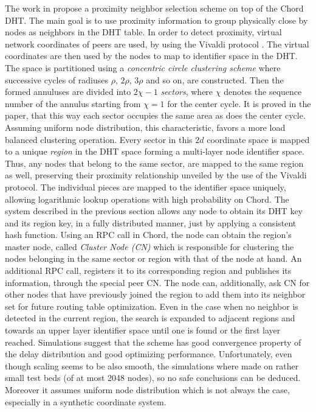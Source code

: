 The work in \cite{DLTZZ2006} propose a proximity neighbor selection
scheme on top of the Chord DHT. The main goal is to use proximity information
to group physically close by nodes as neighbors in the DHT table. In order to
detect proximity, virtual network coordinates of peers are used, by using the
Vivaldi protocol \cite{cox_vivaldi_2004}. The virtual coordinates are then used
by the nodes to map to identifier space in the DHT. The space is partitioned
using a \emph{concentric circle clustering scheme} where successive cycles of
radiuses $\rho$, $2\rho$, $3\rho$ and so on, are constructed. Then the formed
annuluses are divided into $2\chi-1$ \emph{sectors}, where $\chi$ denotes the
sequence number of the annulus starting from $\chi = 1$ for the center cycle. It
is proved in the paper, that this way each sector occupies the same area as does
the center cycle. Assuming uniform node distribution, this characteristic,
favors a more load balanced clustering operation. Every sector in this $2d$
coordinate space is mapped to a unique \emph{region} in the DHT space forming a
multi-layer node identifier space.  Thus, any nodes that belong to the same
sector, are mapped to the same region as well, preserving their proximity
relationship unveiled by the use of the Vivaldi protocol. The individual pieces
are mapped to the identifier space uniquely, allowing logarithmic lookup
operations with high probability on Chord. The system described in the previous
section allows any node to obtain its DHT key and its region key, in a fully
distributed manner, just by applying a consistent hash function. Using an RPC
call in Chord, the node can obtain the region's master node, called
\emph{Cluster Node (CN)} which is responsible for clustering the nodes belonging
in the same sector or region with that of the node at hand. An additional RPC
call, registers it to its corresponding region and publishes its information,
through the special peer CN. The node can, additionally, ask CN for other
nodes that have previously joined the region to add them into its
neighbor set for future routing table optimization. Even in the case when no
neighbor is detected in the current region, the search is expanded to adjacent
regions and towards an upper layer identifier space until one is found or the
first layer reached. Simulations suggest that the scheme has good convergence
property of the delay distribution and good optimizing performance.
Unfortunately, even though scaling seems to be also smooth, the simulations
where made on rather small test beds (of at most 2048 nodes), so no safe
conclusions can be deduced. Moreover it assumes uniform node distribution which
is not always the case, especially in a synthetic coordinate system.\\

